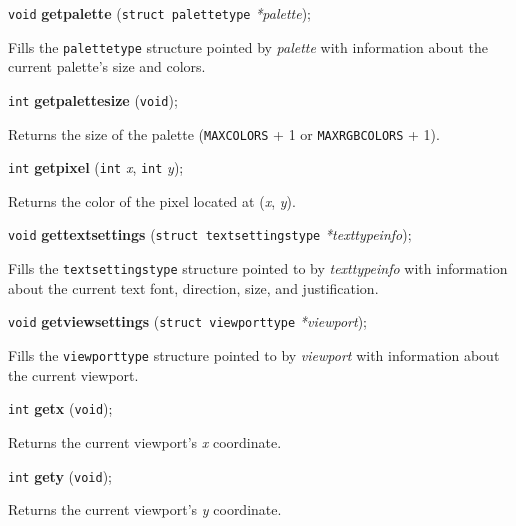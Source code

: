 \documentclass[a4paper,11pt]{article}
\newcommand{\V}{\texttt{void}}      %
\newcommand{\I}{\texttt{int}}       %
\newcommand{\func}[1]{\textbf{#1}}  %
\newcommand{\A}[1]{\emph{#1}}       %
\newcommand{\T}[1]{\texttt{#1}}     %
\newenvironment{bgi}
{ %
  \begin{snugshade}
}
{ %
  \end{snugshade}
}
\begin{document}
\begin{bgi}
\V{} \func{getpalette} (\texttt{struct palettetype} \A{*palette});
\end{bgi}

Fills the \texttt{palettetype} structure pointed by \A{palette} with
information about the current palette's size and colors.


\begin{bgi}
\I{} \func{getpalettesize} (\V{}); 
\end{bgi}

Returns the size of the palette (\T{MAXCOLORS} + 1 or
\T{MAXRGB\-COLORS} + 1).


\begin{bgi}
\I{} \func{getpixel} (\I{} \A{x}, \I{} \A{y});
\end{bgi}

Returns the color of the pixel located at (\A{x}, \A{y}).


\begin{bgi}
\V{} \func{gettextsettings} (\texttt{struct textsettingstype}
\A{*texttypeinfo});
\end{bgi}

Fills the \texttt{textsettingstype} structure pointed to by
\A{texttypeinfo} with information about the current text font,
direction, size, and justification.


\begin{bgi}
\V{} \func{getviewsettings} (\texttt{struct viewporttype} \A{*viewport});
\end{bgi}

Fills the \texttt{viewporttype} structure pointed to by \A{viewport}
with information about the current viewport.


\begin{bgi}
\I{} \func{getx} (\V{});
\end{bgi}

Returns the current viewport's \A{x} coordinate.


\begin{bgi}
\I{} \func{gety} (\V{});
\end{bgi}

Returns the current viewport's \A{y} coordinate.

\end{document}
